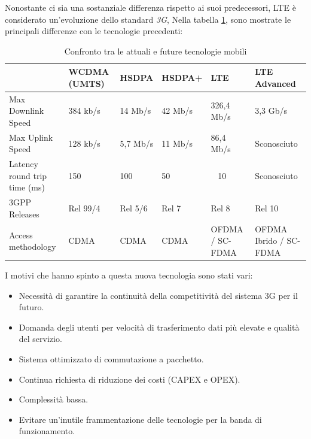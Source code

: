 Nonostante ci sia una sostanziale differenza rispetto ai suoi predecessori, \ac{LTE} è considerato un'evoluzione dello standard \emph{3G},
Nella tabella \ref{tab:confronto}, sono mostrate le principali differenze con le tecnologie precedenti:

 \begin{table}[h]\footnotesize
  \caption{Confronto tra le attuali e future tecnologie mobili}
  \label{tab:confronto}
  \begin{tabularx}{\textwidth}{XXXXXX}
    \toprule
      & WCDMA (UMTS) & HSDPA & HSDPA+ & LTE & LTE Advanced \\
    \midrule
      Max Downlink Speed & 384 kb/s & 14 Mb/s & 42 Mb/s & 326,4 Mb/s & 3,3 Gb/s \\
      Max Uplink Speed & 128 kb/s & 5,7 Mb/s & 11 Mb/s & 86,4 Mb/s & Sconosciuto \\
      Latency round trip time (ms) & 150 & 100 & 50 & ~ 10 & Sconosciuto \\
      3GPP Releases & Rel 99/4 & Rel 5/6 & Rel 7 & Rel 8 & Rel 10 \\
      Access methodology & CDMA & CDMA & CDMA & OFDMA / SC-FDMA & OFDMA Ibrido / SC-FDMA \\
    \bottomrule
    \end{tabularx}
  \end{table}

I motivi che hanno spinto a questa nuova tecnologia sono stati vari:
\begin{itemize}
 \item Necessità di garantire la continuità della competitività del sistema 3G per il futuro.
 \item Domanda degli utenti per velocità di trasferimento dati più elevate e qualità del servizio.
 \item Sistema ottimizzato di commutazione a pacchetto.
 \item Continua richiesta di riduzione dei costi (CAPEX e OPEX).
 \item Complessità bassa.
 \item Evitare un'inutile frammentazione delle tecnologie per la banda di funzionamento.
\end{itemize}

